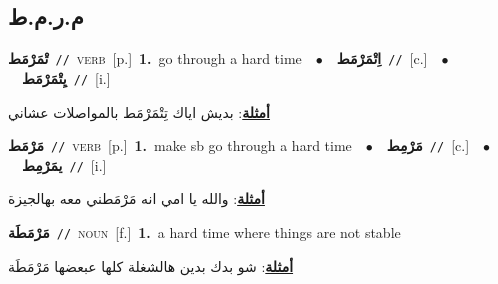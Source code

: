 \documentclass[10pt,a4paper,twoside]{article} %
\begin{document}
\begin{multicols}{2}
\vspace{-3mm}
\subsection*{\color{blue}\foreignlanguage{arabic}{م.ر.م.ط}\color{blue}{}} 

{\setlength\topsep{0pt}\textbf{\foreignlanguage{arabic}{تْمَرْمَط}}\ {\color{gray}\texttt{//}\color{black}}\ \textsc{verb}\ [p.]\ \textbf{1.}~go through a hard time\ \ $\bullet$\ \ \setlength\topsep{0pt}\textbf{\foreignlanguage{arabic}{اِتْمَرْمَط}}\ {\color{gray}\texttt{//}\color{black}}\ [c.]\ \ $\bullet$\ \ \setlength\topsep{0pt}\textbf{\foreignlanguage{arabic}{يِتْمَرْمَط}}\ {\color{gray}\texttt{//}\color{black}}\ [i.]\  \begin{flushright}\color{gray}\foreignlanguage{arabic}{\textbf{\underline{\foreignlanguage{arabic}{أمثلة}}}: بديش اياك تِتْمَرْمَط بالمواصلات عشاني}\end{flushright}\color{black}} \vspace{2mm}

{\setlength\topsep{0pt}\textbf{\foreignlanguage{arabic}{مَرْمَط}}\ {\color{gray}\texttt{//}\color{black}}\ \textsc{verb}\ [p.]\ \textbf{1.}~make sb go through a hard time\ \ $\bullet$\ \ \setlength\topsep{0pt}\textbf{\foreignlanguage{arabic}{مَرْمِط}}\ {\color{gray}\texttt{//}\color{black}}\ [c.]\ \ $\bullet$\ \ \setlength\topsep{0pt}\textbf{\foreignlanguage{arabic}{يمَرْمِط}}\ {\color{gray}\texttt{//}\color{black}}\ [i.]\  \begin{flushright}\color{gray}\foreignlanguage{arabic}{\textbf{\underline{\foreignlanguage{arabic}{أمثلة}}}: والله يا امي انه مَرْمَطني معه بهالجيزة}\end{flushright}\color{black}} \vspace{2mm}

{\setlength\topsep{0pt}\textbf{\foreignlanguage{arabic}{مَرْمَطَة}}\ {\color{gray}\texttt{//}\color{black}}\ \textsc{noun}\ [f.]\ \textbf{1.}~a hard time where things are not stable\  \begin{flushright}\color{gray}\foreignlanguage{arabic}{\textbf{\underline{\foreignlanguage{arabic}{أمثلة}}}: شو بدك بدين هالشغلة كلها عبعضها مَرْمَطَة}\end{flushright}\color{black}} \vspace{2mm}


\end{multicols}
\end{document}

